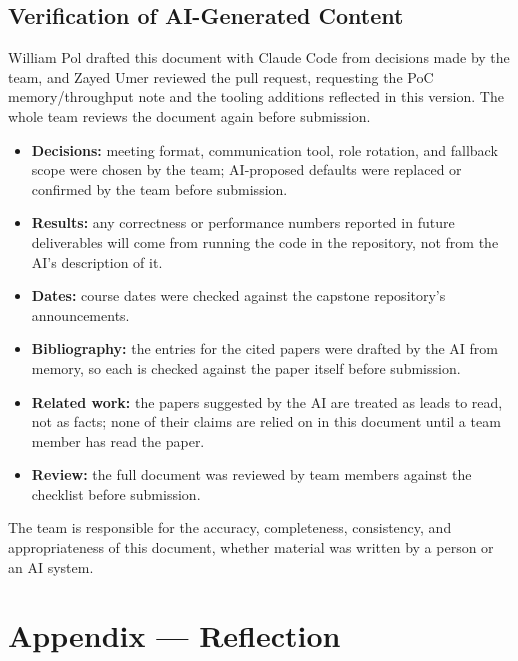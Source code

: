 \documentclass{article}
\begin{document}
\subsection{Verification of AI-Generated Content}

William Pol drafted this document with Claude Code from decisions made by
the team, and Zayed Umer reviewed the pull request, requesting the PoC
memory/throughput note and the tooling additions reflected in this
version. The whole team reviews the document again before submission.

\begin{itemize}
  \item \textbf{Decisions:} meeting format, communication tool, role
  rotation, and fallback scope were chosen by the team; AI-proposed
  defaults were replaced or confirmed by the team before submission.
  \item \textbf{Results:} any correctness or performance numbers reported
  in future deliverables will come from running the code in the
  repository, not from the AI's description of it.
  \item \textbf{Dates:} course dates were checked against the capstone
  repository's announcements.
  \item \textbf{Bibliography:} the entries for the cited papers were
  drafted by the AI from memory, so each is checked against the paper
  itself before submission.
  \item \textbf{Related work:} the papers suggested by the AI are treated
  as leads to read, not as facts; none of their claims are relied on in
  this document until a team member has read the paper.
  \item \textbf{Review:} the full document was reviewed by team members
  against the checklist before submission.
\end{itemize}

The team is responsible for the accuracy, completeness, consistency, and
appropriateness of this document, whether material was written by a person
or an AI system.

\newpage{}

\section*{Appendix --- Reflection}


\end{document}
